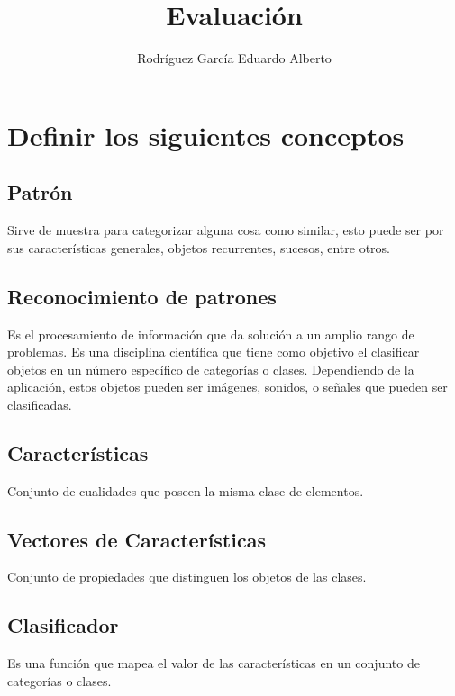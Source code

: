 \documentclass[stu, 12pt, letterpaper, donotrepeattitle, floatsintext, natbib]{apa7}
\title{\Large Evaluación}
\author{Rodríguez García Eduardo Alberto} %
\begin{document}
    \maketitle


    \renewcommand\contentsname{\largeÍndice}
    \tableofcontents
    \setcounter{tocdepth}{2}
    \clearpage
    \renewcommand{\listfigurename}{\largeÍndice de fíguras}
    \listoffigures
    \clearpage
    \renewcommand{\listtablename}{\largeÍndice de tablas}
    \listoftables
    \clearpage


    \section{\large Definir los siguientes conceptos}

        \subsection{Patrón}
            Sirve de muestra para categorizar alguna cosa como similar, esto puede ser por sus características generales, objetos recurrentes, sucesos, entre otros.

        \subsection{Reconocimiento de patrones}
            Es el procesamiento de información que da solución a un amplio rango de problemas. Es una disciplina científica que tiene como objetivo el clasificar objetos en un número específico de categorías o clases. Dependiendo de la aplicación, estos objetos pueden ser imágenes, sonidos, o señales que pueden ser clasificadas.

        \subsection{Características}
            Conjunto de cualidades que poseen la misma clase de elementos.


        \subsection{Vectores de Características}
            Conjunto de propiedades que distinguen los objetos de las clases.

        \subsection{Clasificador}
            Es una función que mapea el valor de las características en un conjunto de categorías o clases.
\end{document}
